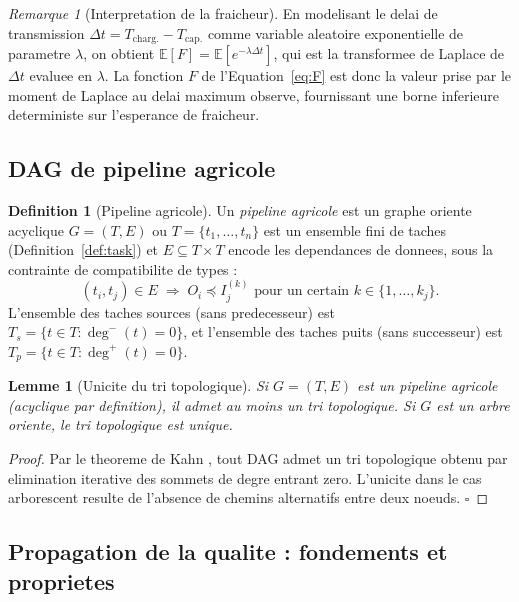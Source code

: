 \documentclass[12pt,a4paper]{article}
\theoremstyle{plain}
\newtheorem{lemma}[theorem]{Lemme}
\theoremstyle{definition}
\newtheorem{definition}[theorem]{Definition}
\theoremstyle{remark}
\newtheorem{remark}[theorem]{Remarque}
\newcommand{\E}{\mathbb{E}}
\begin{document}
\begin{remark}[Interpretation de la fraicheur]
En modelisant le delai de transmission $\Delta t = T_{\text{charg.}} -
T_{\text{cap.}}$ comme variable aleatoire exponentielle de parametre
$\lambda$, on obtient $\E[F] = \E[e^{-\lambda\Delta t}]$, qui est
la transformee de Laplace de $\Delta t$ evaluee en $\lambda$.
La fonction $F$ de l'Equation~\eqref{eq:F} est donc la valeur prise
par le moment de Laplace au delai maximum observe, fournissant une
borne inferieure deterministe sur l'esperance de fraicheur.
\end{remark}

\subsection{DAG de pipeline agricole}
\label{subsec:dag}

\begin{definition}[Pipeline agricole]
\label{def:pipeline}
Un \emph{pipeline agricole} est un graphe oriente acyclique
$G = (T, E)$ ou $T = \{t_1,\ldots,t_n\}$ est un ensemble fini de
taches (Definition~\ref{def:task}) et $E \subseteq T \times T$
encode les dependances de donnees, sous la contrainte de compatibilite
de types :
\[
(t_i, t_j) \in E \;\Rightarrow\;
O_i \preceq I_j^{(k)} \text{ pour un certain } k \in \{1,\ldots,k_j\}.
\]
L'ensemble des taches sources (sans predecesseur) est
$T_s = \{t \in T : \deg^{-}(t) = 0\}$, et l'ensemble des taches
puits (sans successeur) est
$T_p = \{t \in T : \deg^{+}(t) = 0\}$.
\end{definition}

\begin{lemma}[Unicite du tri topologique]
\label{lem:topo}
Si $G=(T,E)$ est un pipeline agricole (acyclique par definition),
il admet au moins un tri topologique. Si $G$ est un arbre oriente,
le tri topologique est unique.
\end{lemma}

\begin{proof}
Par le theoreme de Kahn \cite{kahn_topological}, tout DAG admet un
tri topologique obtenu par elimination iterative des sommets de
degre entrant zero. L'unicite dans le cas arborescent resulte de
l'absence de chemins alternatifs entre deux noeuds. \hfill$\square$
\end{proof}

\subsection{Propagation de la qualite : fondements et proprietes}
\label{subsec:quality_prop}
\end{document}
